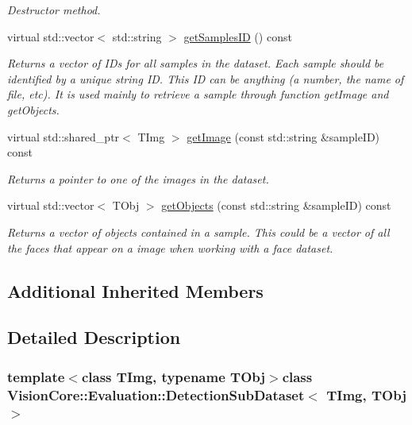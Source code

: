 \begin{DoxyCompactItemize}
\begin{DoxyCompactList}\small\item\em Destructor method. \end{DoxyCompactList}\item 
virtual std\+::vector$<$ std\+::string $>$ \hyperlink{class_vision_core_1_1_evaluation_1_1_detection_sub_dataset_a8f2602813f5b8c2c6512690efbabb2df}{get\+Samples\+I\+D} () const 
\begin{DoxyCompactList}\small\item\em Returns a vector of I\+Ds for all samples in the dataset. Each sample should be identified by a unique string I\+D. This I\+D can be anything (a number, the name of file, etc). It is used mainly to retrieve a sample through function get\+Image and get\+Objects. \end{DoxyCompactList}\item 
virtual std\+::shared\+\_\+ptr$<$ T\+Img $>$ \hyperlink{class_vision_core_1_1_evaluation_1_1_detection_sub_dataset_a8d5c26c8bba720739540caea9cd2f630}{get\+Image} (const std\+::string \&sample\+I\+D) const 
\begin{DoxyCompactList}\small\item\em Returns a pointer to one of the images in the dataset. \end{DoxyCompactList}\item 
virtual std\+::vector$<$ T\+Obj $>$ \hyperlink{class_vision_core_1_1_evaluation_1_1_detection_sub_dataset_a4c1bd88038f81317438d052bcbf2bfaa}{get\+Objects} (const std\+::string \&sample\+I\+D) const 
\begin{DoxyCompactList}\small\item\em Returns a vector of objects contained in a sample. This could be a vector of all the faces that appear on a image when working with a face dataset. \end{DoxyCompactList}\end{DoxyCompactItemize}
\subsection*{Additional Inherited Members}


\subsection{Detailed Description}
\subsubsection*{template$<$class T\+Img, typename T\+Obj$>$class Vision\+Core\+::\+Evaluation\+::\+Detection\+Sub\+Dataset$<$ T\+Img, T\+Obj $>$}

